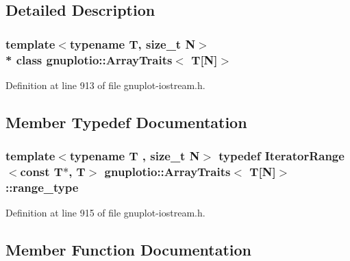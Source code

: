 \subsection{Detailed Description}
\subsubsection*{template$<$typename T, size\+\_\+t N$>$\\*
class gnuplotio\+::\+Array\+Traits$<$ T\mbox{[}\+N\mbox{]}$>$}



Definition at line 913 of file gnuplot-\/iostream.\+h.



\subsection{Member Typedef Documentation}
\subsubsection[{\texorpdfstring{range\+\_\+type}{range_type}}]{\setlength{\rightskip}{0pt plus 5cm}template$<$typename T , size\+\_\+t N$>$ typedef {\bf Iterator\+Range}$<$const T$\ast$, T$>$ {\bf gnuplotio\+::\+Array\+Traits}$<$ T\mbox{[}N\mbox{]}$>$\+::{\bf range\+\_\+type}}\hypertarget{classgnuplotio_1_1_array_traits_3_01_t[_n]_4_a926f3c3d14fbe82aab7b70ccc16d20fb}{}\label{classgnuplotio_1_1_array_traits_3_01_t[_n]_4_a926f3c3d14fbe82aab7b70ccc16d20fb}


Definition at line 915 of file gnuplot-\/iostream.\+h.



\subsection{Member Function Documentation}
